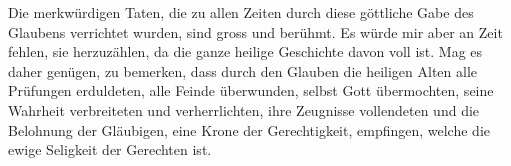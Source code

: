 \medskip 

Die merkwürdigen Taten, die zu allen Zeiten durch diese göttliche Gabe des
Glaubens verrichtet wurden, sind gross und berühmt. Es würde mir aber an Zeit
fehlen, sie herzuzählen, da die ganze heilige Geschichte davon voll ist. Mag es
daher genügen, zu bemerken, dass durch den Glauben die heiligen Alten alle
Prüfungen erduldeten, alle Feinde überwunden, selbst Gott übermochten, seine
Wahrheit verbreiteten und verherrlichten, ihre
Zeugnisse vollendeten und die
Belohnung der Gläubigen, eine Krone der
Gerechtigkeit, empfingen, welche die
ewige Seligkeit der Gerechten ist.




